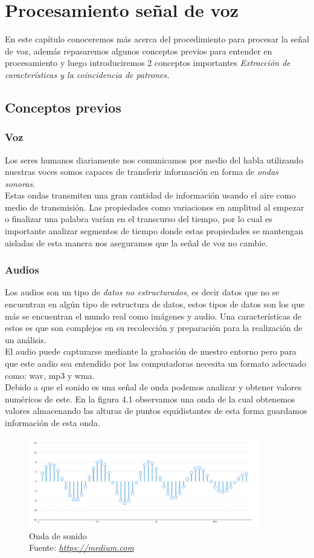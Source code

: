 \chapter{Procesamiento señal de voz}
En este capítulo conoceremos más acerca del procedimiento para procesar la señal de voz, además repasaremos algunos conceptos previos para entender en procesamiento y luego introduciremos 2 conceptos importantes \textit{Extracción de características y la coincidencia de patrones.}

\section{Conceptos previos}
\subsection{Voz}
Los seres humanos diariamente nos comunicamos por medio del habla utilizando nuestras voces somos capaces de transferir información en forma de \textit{ondas sonoras}.\\ Estas ondas transmiten una gran cantidad de información usando el aire como medio de transmisión.
Las propiedades como variaciones en amplitud al empezar o finalizar una palabra varían en el transcurso del tiempo, por lo cual es importante analizar segmentos de tiempo donde estas propiedades se mantengan aisladas de esta manera nos aseguramos que la señal de voz no cambie.
\subsection{Audios}
Los audios son un tipo de \textit{datos no estructurados}, es decir datos que no se encuentran en algún tipo de estructura de datos, estos tipos de datos son los que más se encuentran el mundo real como imágenes y audio. Una características de estos es que son complejos en su recolección y preparación para la realización de un análisis.\\ El audio puede capturarse mediante la grabación de nuestro entorno pero para que este audio sea entendido por las computadoras necesita un formato adecuado como: wav, mp3 y wma. \\
Debido a que el sonido es una señal de onda podemos analizar y obtener valores numéricos de este. En la figura 4.1 observamos una onda de la cual obtenemos valores almacenando las alturas de puntos equidistantes de esta forma guardamos información de esta onda.
\begin{figure}[H]
	\centering
	\includegraphics[width=0.9\textwidth]{Figures/onda.png}
	\caption{Onda de sonido \\ Fuente:  \href{https://medium.com/@venkateshpnk22/how-to-convert-your-speech-voice-to-text-data-1b2686099260}{\textit{https://medium.com}}}
	\label{onda}
\end{figure} 
